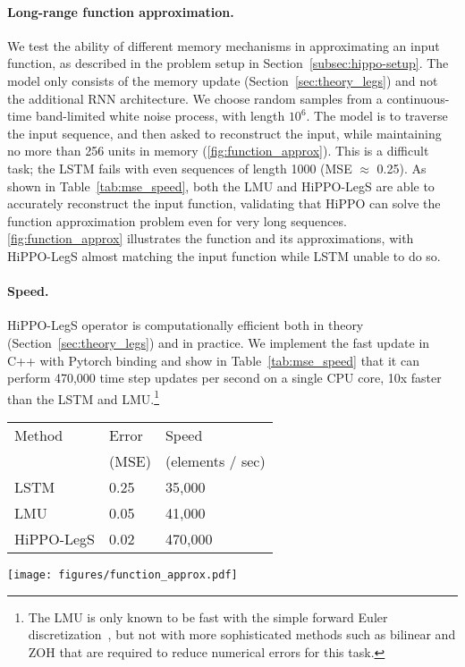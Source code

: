 \documentclass{article}
\begin{document}
\paragraph{Long-range function approximation.}
We test the ability of
different memory mechanisms in approximating an input function, as described in
the problem setup in Section~\ref{subsec:hippo-setup}.
The model only consists of the memory update (Section~\ref{sec:theory_legs}) and
not the additional RNN architecture.
We choose random samples from a continuous-time band-limited white noise
process, with length $10^6$.
The model is to traverse the input sequence, and then asked to reconstruct the
input, while maintaining no more than 256 units in memory (\cref{fig:function_approx}).
This is a difficult task; the LSTM fails with even sequences of length 1000 (MSE
$\approx$ 0.25).
As shown in Table~\ref{tab:mse_speed}, both the LMU and HiPPO-LegS are able to
accurately reconstruct the input function, validating that HiPPO can solve the
function approximation problem even for very long sequences.
\cref{fig:function_approx} illustrates the function and its approximations, with
HiPPO-LegS almost matching the input function while LSTM unable to do so.

\paragraph{Speed.}
HiPPO-LegS operator is computationally efficient both in theory
(Section~\ref{sec:theory_legs}) and in practice.
We implement the fast update in C++ with Pytorch binding and show in
Table~\ref{tab:mse_speed} that it can perform 470,000 time step updates per second on a single CPU
core, 10x faster than the LSTM and LMU.\footnote{The LMU is only known to be fast with the simple forward Euler
discretization~\citep{voelker2019legendre}, but not with more sophisticated methods such as bilinear and
ZOH that are required to reduce numerical errors for this task.}

\begin{minipage}{.4\linewidth}
  \small
  \centering
  \begin{tabular}{lll}
      \toprule
      Method     & Error  & Speed  \\
      & (MSE) & (elements / sec) \\
      \midrule
      LSTM       & 0.25 & 35,000             \\
      LMU        & 0.05 & 41,000             \\
      HiPPO-LegS & 0.02 & 470,000            \\
      \bottomrule
  \end{tabular}
  \label{tab:mse_speed}
\end{minipage}\hfill
\begin{minipage}{.6\linewidth}\centering
  \texttt{[image: figures/function\_approx.pdf]}
  \label{fig:function_approx}
\end{minipage}
\end{document}
